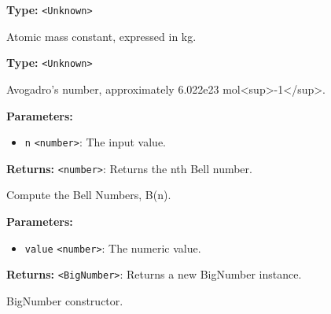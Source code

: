 \documentclass[12pt,a4paper]{article}
\begin{document}
\vspace{5mm}
\noindent {}\vspace{4mm}


\noindent \textbf{Type:} \texttt{<Unknown>}

\noindent Atomic mass constant, expressed in kg.

\vspace{5mm}
\noindent {}\vspace{4mm}


\noindent \textbf{Type:} \texttt{<Unknown>}

\noindent Avogadro's number, approximately \textasciigrave{}6.022e23\textasciigrave{} mol<sup>-1</sup>.

\vspace{5mm}
\noindent {}


\noindent \textbf{Parameters:}
\begin{itemize}
  \item \texttt{n} \texttt{<number>}: The input value.
\end{itemize}

\noindent \textbf{Returns:} \texttt{<number>}: Returns the nth Bell number.

\noindent Compute the Bell Numbers, \textasciigrave{}B(n)\textasciigrave{}.

\vspace{5mm}
\noindent {}


\noindent \textbf{Parameters:}
\begin{itemize}
  \item \texttt{value} \texttt{<number>}: The numeric value.
\end{itemize}

\noindent \textbf{Returns:} \texttt{<BigNumber>}: Returns a new BigNumber instance.

\noindent BigNumber constructor.

\vspace{5mm}
\noindent {}
\end{document}
